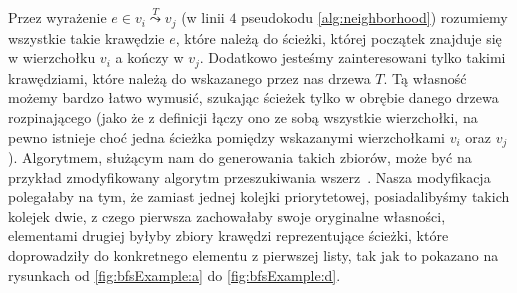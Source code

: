 Przez wyrażenie $e \in v_{i} \overset{T}{\leadsto} v_{j}$ (w linii $4$ pseudokodu \ref{alg:neighborhood}) rozumiemy wszystkie takie krawędzie $e$, które należą do ścieżki, której początek znajduje się w wierzchołku $v_{i}$ a kończy w $v_{j}$. Dodatkowo jesteśmy zainteresowani tylko takimi krawędziami, które należą do wskazanego przez nas drzewa $T$. Tą własność możemy bardzo łatwo wymusić, szukając ścieżek tylko w obrębie danego drzewa rozpinającego (jako że z definicji łączy ono ze sobą wszystkie wierzchołki, na pewno istnieje choć jedna ścieżka pomiędzy wskazanymi wierzchołkami $v_{i}$ oraz $v_{j}$). Algorytmem, służącym nam do generowania takich zbiorów, może być na przykład zmodyfikowany algorytm przeszukiwania wszerz~\cite[$604$--$606$]{Cormen}. Nasza modyfikacja polegałaby na tym, że zamiast jednej kolejki priorytetowej, posiadalibyśmy takich kolejek dwie, z czego pierwsza zachowałaby swoje oryginalne własności, elementami drugiej byłyby zbiory krawędzi reprezentujące ścieżki, które doprowadziły do konkretnego elementu z pierwszej listy, tak jak to pokazano na rysunkach od \ref{fig:bfsExample:a} do \ref{fig:bfsExample:d}.

